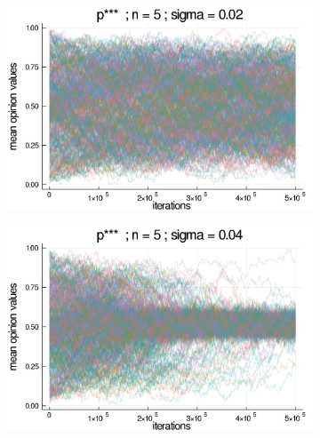 \documentclass{article}
\begin{document}
    
    \begin{figure}[H]
      \centering
      \begin{subfigure}[b]{0.48\textwidth}
        \includegraphics[width=\textwidth]{img/series/tseries2/Poodlcalculatepsssn5-rho005-sigma002-00intransrandom.png}
      \end{subfigure}
      
      \begin{subfigure}[b]{0.48\textwidth}
        \includegraphics[width=\textwidth]{img/series/tseries2/Poodlcalculatepsssn5-rho005-sigma004-00intransrandom.png}
      \end{subfigure}
      

\end{figure}
\end{document}
